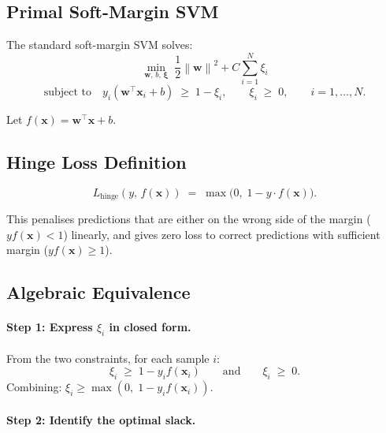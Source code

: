 \documentclass[12pt,a4paper]{article}
\newcommand{\bx}{\bm{x}}
\newcommand{\bw}{\bm{w}}
\newcommand{\norm}[1]{\left\lVert #1 \right\rVert}
\begin{document}
\subsection*{Primal Soft-Margin SVM}

The standard soft-margin SVM solves:
\begin{equation}
  \min_{\bw,\, b,\, \bm{\xi}}\;
  \frac{1}{2}\norm{\bw}^2 + C\sum_{i=1}^{N}\xi_i
  \label{eq:svm_primal}
\end{equation}
\begin{equation*}
  \text{subject to}\quad
  y_i(\bw^\top\bx_i + b) \;\geq\; 1 - \xi_i,
  \qquad
  \xi_i \;\geq\; 0,
  \qquad i = 1,\ldots,N.
\end{equation*}

Let $f(\bx) = \bw^\top\bx + b$.

\subsection*{Hinge Loss Definition}

\begin{equation}
  \boxed{
  L_{\text{hinge}}(y,\, f(\bx))
  \;=\;
  \max\!\bigl(0,\; 1 - y\cdot f(\bx)\bigr).
  }
  \label{eq:hinge}
\end{equation}

This penalises predictions that are either on the wrong side of the margin
($y f(\bx) < 1$) linearly, and gives zero loss to correct predictions with
sufficient margin ($y f(\bx) \geq 1$).

\subsection*{Algebraic Equivalence}

\paragraph{Step 1: Express $\xi_i$ in closed form.}

From the two constraints, for each sample $i$:
\begin{equation*}
  \xi_i \;\geq\; 1 - y_i f(\bx_i)
  \qquad\text{and}\qquad
  \xi_i \;\geq\; 0.
\end{equation*}
Combining: $\xi_i \geq \max(0,\; 1 - y_i f(\bx_i))$.

\paragraph{Step 2: Identify the optimal slack.}
\end{document}
